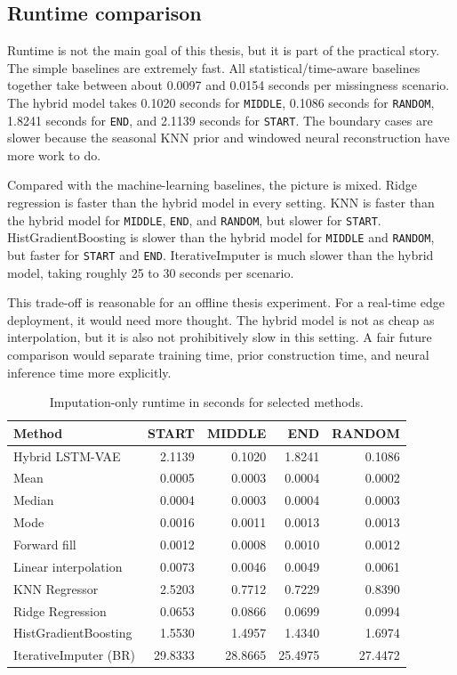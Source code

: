 \subsection{Runtime comparison}

Runtime is not the main goal of this thesis, but it is part of the practical story. The simple baselines are extremely fast. All statistical/time-aware baselines together take between about 0.0097 and 0.0154 seconds per missingness scenario. The hybrid model takes 0.1020 seconds for \texttt{MIDDLE}, 0.1086 seconds for \texttt{RANDOM}, 1.8241 seconds for \texttt{END}, and 2.1139 seconds for \texttt{START}. The boundary cases are slower because the seasonal KNN prior and windowed neural reconstruction have more work to do.

Compared with the machine-learning baselines, the picture is mixed. Ridge regression is faster than the hybrid model in every setting. KNN is faster than the hybrid model for \texttt{MIDDLE}, \texttt{END}, and \texttt{RANDOM}, but slower for \texttt{START}. HistGradientBoosting is slower than the hybrid model for \texttt{MIDDLE} and \texttt{RANDOM}, but faster for \texttt{START} and \texttt{END}. IterativeImputer is much slower than the hybrid model, taking roughly 25 to 30 seconds per scenario.

This trade-off is reasonable for an offline thesis experiment. For a real-time edge deployment, it would need more thought. The hybrid model is not as cheap as interpolation, but it is also not prohibitively slow in this setting. A fair future comparison would separate training time, prior construction time, and neural inference time more explicitly.

\begin{table}[ht]
	\centering
	\small
	\begin{tabular}{lrrrr}
		\toprule
		\textbf{Method} & \textbf{START} & \textbf{MIDDLE} & \textbf{END} & \textbf{RANDOM} \\
		\midrule
		Hybrid LSTM-VAE & 2.1139 & 0.1020 & 1.8241 & 0.1086 \\
		Mean & 0.0005 & 0.0003 & 0.0004 & 0.0002 \\
		Median & 0.0004 & 0.0003 & 0.0004 & 0.0003 \\
		Mode & 0.0016 & 0.0011 & 0.0013 & 0.0013 \\
		Forward fill & 0.0012 & 0.0008 & 0.0010 & 0.0012 \\
		Linear interpolation & 0.0073 & 0.0046 & 0.0049 & 0.0061 \\
		KNN Regressor & 2.5203 & 0.7712 & 0.7229 & 0.8390 \\
		Ridge Regression & 0.0653 & 0.0866 & 0.0699 & 0.0994 \\
		HistGradientBoosting & 1.5530 & 1.4957 & 1.4340 & 1.6974 \\
		IterativeImputer (BR) & 29.8333 & 28.8665 & 25.4975 & 27.4472 \\
		\bottomrule
	\end{tabular}
	\caption{Imputation-only runtime in seconds for selected methods.}
	\label{tab:runtime-results}
\end{table}

